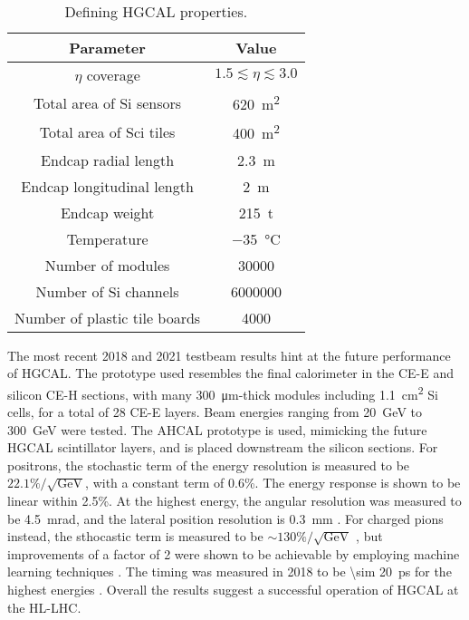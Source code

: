 \documentclass[11pt]{article}
\begin{document}
\begin{table}[!h]
\centering
\begin{tabular}{c|c}
Parameter & Value\\
\hline
\(\eta\) coverage & \(1.5 \lesssim \eta \lesssim 3.0\)\\
Total area of \ac{Si} sensors & \SI{620}{\meter\squared}\\
Total area of \ac{Sci} tiles & \SI{400}{\meter\squared}\\
Endcap radial length & \SI{2.3}{\meter}\\
Endcap longitudinal length & \SI{2}{\meter}\\
Endcap weight & \SI{215}{\tonne}\\
Temperature & \SI{-35}{\celsius}\\
Number of modules & \num{30000}\\
Number of \ac{Si} channels & \num{6000000}\\
Number of plastic tile boards & \num{4000}\\
\end{tabular}
\caption{\label{tab:HGCALparameters}Defining HGCAL properties.}

\end{table}

The most recent 2018 and 2021 testbeam results hint at the future performance of \ac{HGCAL}.
The prototype used resembles the final calorimeter in the \ac{CE-E} and silicon \ac{CE-H} sections, with many \SI{300}{\micro\meter}-thick modules including \SI{1.1}{\cm\squared} \ac{Si} cells, for a total of 28 \ac{CE-E} layers.
Beam energies ranging from \SI{20}{\GeV} to \SI{300}{\GeV} were tested.
The \ac{AHCAL} prototype \cite{testbeam_ahcal} is used, mimicking the future \ac{HGCAL} scintillator layers, and is placed downstream the silicon sections.
For positrons, the stochastic term of the energy resolution is measured to be \(22.1\%/\sqrt{\text{GeV}}\), with a constant term of 0.6\%.
The energy response is shown to be linear within 2.5\%.
At the highest energy, the angular resolution was measured to be \SI{4.5}{\milli\radian}, and the lateral position resolution is \SI{0.3}{\mm} \cite{hgcal_testbeam_positrons}.
For charged pions instead, the sthocastic term is measured to be \(\sim 130\%/\sqrt{\text{GeV}}\) \cite{hgcal_testbeam_pions}, but improvements of a factor of \num{2} were shown to be achievable by employing machine learning techniques \cite{hgcal_testbeam_pions_gnn}.
The timing was measured in 2018 to be \SI{\sim 20}{\pico\second} for the highest energies \cite{hgcal_testbeam_timing}.
Overall the results suggest a successful operation of \ac{HGCAL} at the \ac{HL-LHC}.
\end{document}
